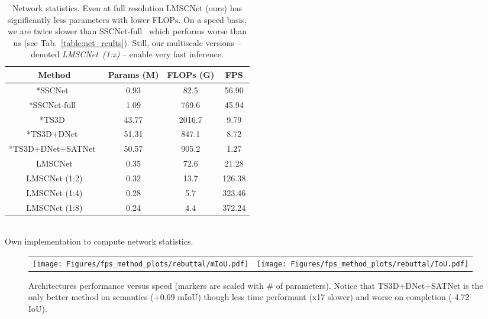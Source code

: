 \begin{table}[!h]
	\footnotesize
	\centering
	\setlength{\tabcolsep}{0.01\linewidth}
	\begin{tabular}{cccc}
		\toprule
		Method & Params (M) &  FLOPs (G) & FPS\\
		\midrule
		*SSCNet~\cite{Song2017SemanticSC}                    & 0.93 & 82.5 & 56.90 \\  
		*SSCNet-full~\cite{Song2017SemanticSC}             & 1.09 & 769.6 & 45.94 \\
		*TS3D~\cite{Garbade2019TwoS3}                        & 43.77 & 2016.7 & 9.79 \\  *TS3D+DNet~\cite{Behley2019SemanticKITTIAD}          & 51.31 & 847.1 & 8.72\\ *TS3D+DNet+SATNet~\cite{Behley2019SemanticKITTIAD}   & 50.57 & 905.2 & 1.27\\  \midrule
		LMSCNet			                                 & 0.35 & 72.6 & 21.28\\
		LMSCNet (1:2)                                 & 0.32 & 13.7  & 126.38\\
		LMSCNet (1:4)                                 & 0.28 & 5.7  & 323.46\\
		LMSCNet (1:8)                                 & 0.24 & 4.4  & 372.24\\
		\bottomrule
	\end{tabular}\\
	{\scriptsize * Own implementation to compute network statistics.}
	\caption{Network statistics. Even at full resolution \mbox{LMSCNet} (ours) has significantly less parameters with lower FLOPs. On a speed basis, we are twice slower than SSCNet-full~\cite{Song2017SemanticSC} which performs worse than us (see Tab.~\ref{table:net_reults}). Still, our multiscale versions -- denoted \mbox{\textit{LMSCNet (1:x)}} -- enable very fast inference.}
	\label{table:net_stats}
\end{table}

\begin{figure}
	\centering
	\scriptsize
	\setlength{\tabcolsep}{0.005\linewidth}
	\renewcommand{\arraystretch}{0.7}
	\begin{tabular}{cc}
		\texttt{[image: Figures/fps\_method\_plots/rebuttal/mIoU.pdf]}&\texttt{[image: Figures/fps\_method\_plots/rebuttal/IoU.pdf]}\\
	\end{tabular}\vspace{-1em}
	\caption{Architectures performance versus speed (markers are scaled with \# of parameters). Notice that \mbox{TS3D+DNet+SATNet} is the only better method on semantics (+0.69 mIoU) though less time performant (x17 slower) and worse on completion (-4.72 IoU).}
	\label{fig:scatter-perf-speed-params}
\end{figure} 

